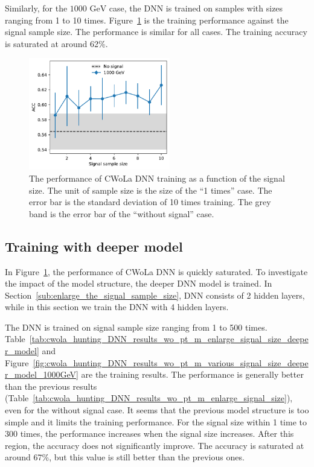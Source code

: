 \documentclass[12pt]{article}
\begin{document}
        Similarly, for the $\text{1000 GeV}$ case, the DNN is trained on samples with sizes ranging from 1 to 10 times. Figure~\ref{fig:cwola_hunting_DNN_results_wo_pt_m_various_signal_size_1000GeV} is the training performance against the signal sample size. The performance is similar for all cases. The training accuracy is saturated at around 62\%.
        \begin{figure}[htpb]
            \centering
            \includegraphics[width=0.55\textwidth]{ACC_vs_signal_sample_size-1000GeV.pdf}
            \caption{The performance of CWoLa DNN training as a function of the signal size. The unit of sample size is the size of the ``1 times'' case. The error bar is the standard deviation of 10 times training. The grey band is the error bar of the ``without signal'' case.}
            \label{fig:cwola_hunting_DNN_results_wo_pt_m_various_signal_size_1000GeV}
        \end{figure}

    \subsection{Training with deeper model}%
    \label{sub:training_with_deeper_model}
        In Figure~\ref{fig:cwola_hunting_DNN_results_wo_pt_m_various_signal_size_1000GeV}, the performance of CWoLa DNN is quickly saturated. To investigate the impact of the model structure, the deeper DNN model is trained. In Section~\ref{sub:enlarge_the_signal_sample_size}, DNN consists of 2 hidden layers, while in this section we train the DNN with 4 hidden layers.

        The DNN is trained on signal sample size ranging from 1 to 500 times. Table~\ref{tab:cwola_hunting_DNN_results_wo_pt_m_enlarge_signal_size_deeper_model} and Figure~\ref{fig:cwola_hunting_DNN_results_wo_pt_m_various_signal_size_deeper_model_1000GeV} are the training results. The performance is generally better than the previous results (Table~\ref{tab:cwola_hunting_DNN_results_wo_pt_m_enlarge_signal_size}), even for the without signal case. It seems that the previous model structure is too simple and it limits the training performance. For the signal size within 1 time to 300 times, the performance increases when the signal size increases. After this region, the accuracy does not significantly improve. The accuracy is saturated at around 67\%, but this value is still better than the previous ones.
\end{document}

